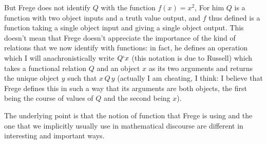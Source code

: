 \documentclass[12pt]{article}
\begin{document}
\begin{description}
But Frege does not identify $Q$ with the function $f(x)=x^2$,  For him $Q$ is a function with two object inputs and a truth value output, and $f$ thus defined
is a function taking a single object input and giving a single object output.  This doesn't mean that Frege doesn't appreciate the importance of the kind of relations that we now identify with functions:  in fact, he defines an operation which I will anachronistically write $Q`x$ (this notation is due to Russell) which takes a functional relation $Q$ and an object $x$ as its two
arguments and returns the unique object $y$ such that $x\,Q\,y$ (actually I am cheating, I think:  I believe that Frege defines this in such a way that its arguments are both objects, the first being the course of values of $Q$ and the second being $x$).

The underlying point is that the notion of function that Frege is using and the one that we implicitly usually use in mathematical discourse are different in interesting and important ways.

\end{description}
\end{document}
